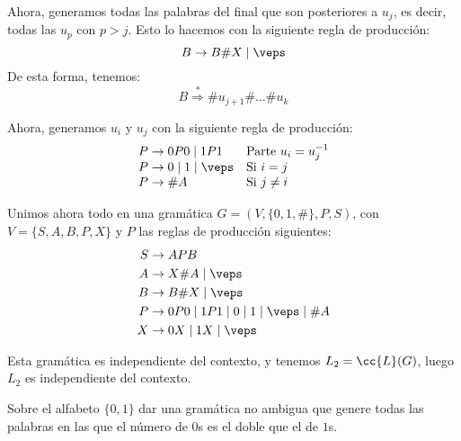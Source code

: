 \begin{ejercicio}
\begin{enumerate}
        Ahora, generamos todas las palabras del final que son posteriores a $u_j$, es decir, todas las $u_p$ con $p>j$. Esto lo hacemos con la siguiente regla de producción:
        \begin{equation*}
            B \to B\#X\mid \veps
        \end{equation*}
        De esta forma, tenemos:
        \begin{equation*}
            B \stackrel{\ast}{\Longrightarrow} \#u_{j+1}\#\dots\#u_k
        \end{equation*}
    
        Ahora, generamos $u_i$ y $u_j$ con la siguiente regla de producción:
        \begin{equation*}
            \begin{array}{ll}
                P\to 0P0\mid 1P1  & \text{Parte }u_i=u_j^{-1}\\
                P \to 0\mid 1 \mid \veps    & \text{Si }i=j\\
                P \to \# A & \text{Si }j\neq i
            \end{array}
        \end{equation*}
        
        Unimos ahora todo en una gramática $G=(V,\{0,1,\#\},P,S)$, con $V=\{S,A,B,P,X\}$ y $P$ las reglas de producción siguientes:
        \begin{equation*}
            \begin{aligned}
                S &\to APB\\
                A &\to X\#A \mid \veps\\
                B &\to B\#X\mid \veps\\
                P &\to 0P0\mid 1P1 \mid 0\mid 1 \mid \veps \mid \# A\\
                X &\to 0X \mid 1X \mid \veps
            \end{aligned}
        \end{equation*}
    
        Esta gramática es independiente del contexto, y tenemos $L_2=\cc{L}(G)$, luego $L_2$ es independiente del contexto.
    \end{enumerate}
\end{ejercicio}

\begin{ejercicio}\label{ej:1.4.17}
    Sobre el alfabeto $\{ 0, 1 \}$ dar una gramática no ambigua que genere todas las palabras en las que el número de $0$s es el doble que el de $1$s.

\end{ejercicio}

